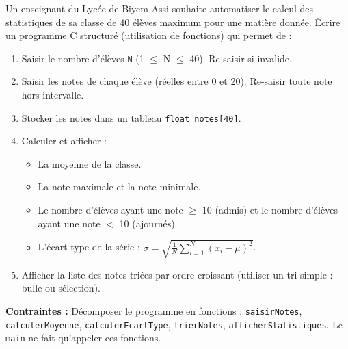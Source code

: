 \documentclass[11pt]{article}
\begin{document}
\begin{exercice}
Un enseignant du Lycée de Biyem-Assi souhaite automatiser le calcul des statistiques de sa classe de 40 élèves maximum pour une matière donnée.
Écrire un programme C structuré (utilisation de fonctions) qui permet de :
\begin{enumerate}
    \item Saisir le nombre d'élèves \texttt{N} (1 $\le$ N $\le$ 40). Re-saisir si invalide.
    \item Saisir les notes de chaque élève (réelles entre 0 et 20). Re-saisir toute note hors intervalle.
    \item Stocker les notes dans un tableau \texttt{float notes[40]}.
    \item Calculer et afficher :
    \begin{itemize}
        \item La moyenne de la classe.
        \item La note maximale et la note minimale.
        \item Le nombre d'élèves ayant une note $\ge$ 10 (admis) et le nombre d'élèves ayant une note $<$ 10 (ajournés).
        \item L'écart-type de la série : $\sigma = \sqrt{\frac{1}{N}\sum_{i=1}^{N}(x_i - \mu)^2}$.
    \end{itemize}
    \item Afficher la liste des notes triées par ordre croissant (utiliser un tri simple : bulle ou sélection).
\end{enumerate}
\textbf{Contraintes :} Décomposer le programme en fonctions : \texttt{saisirNotes}, \texttt{calculerMoyenne}, \texttt{calculerEcartType}, \texttt{trierNotes}, \texttt{afficherStatistiques}. Le \texttt{main} ne fait qu'appeler ces fonctions.
\end{exercice}
\end{document}
